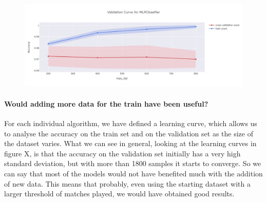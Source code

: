 \begin{figure}[h]
	\centering
	\includegraphics[width=\textwidth]{plots/classification/nn_validation_curve.png}
	\label{fig:nn_validation_curve}
\end{figure}

\paragraph{Would adding more data for the train have been useful?}
For each individual algorithm, we have defined a learning curve, which allows us to analyse the accuracy on the train set and on the validation set as the size of the dataset varies. What we can see in general, looking at the learning curves in figure X, is that the accuracy on the validation set initially has a very high standard deviation, but with more than 1800 samples it starts to converge. So we can say that most of the models would not have benefited much with the addition of new data. This means that probably, even using the starting dataset with a larger threshold of matches played, we would have obtained good results.
\begin{figure}[h]
\end{figure}


